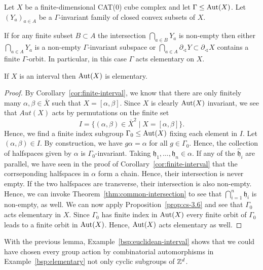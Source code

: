\begin{prop}
  \label{prop:cs-3.6}
  Let \(X\) be a finite-dimensional CAT(0) cube complex and let \(\Gamma \leq \operatorname{Aut}(X)\). Let \((Y_a)_{a \in A}\) be a \(\Gamma\)-invariant family of closed convex subsets of \(X\).

  If for any finite subset \(B \subset A\) the intersection \(\bigcap_{a \in B}Y_a\)  is non-empty then either \(\bigcap_{a \in A} Y_a\) is a non-empty \(\Gamma\)-invariant subspace or \(\bigcap_{a \in A} \partial_{\sphericalangle} Y \subset \partial_{\sphericalangle}X\) contains a finite \(\Gamma\)-orbit. In particular, in this case \(\Gamma\) acts elementary on \(X\).
\end{prop}

\begin{lemma}
  \label{lem:f-3.19}
  If \(X\) is an interval then \(\operatorname{Aut}(X)\) is elementary.
\end{lemma}

\begin{proof}
  By Corollary~\ref{cor:finite-interval}, we know that there are only finitely many \(\alpha, \beta \in \bar X\) such that \(X = [\alpha, \beta]\). Since \(X\) is clearly \(\operatorname{Aut}(X)\) invariant, we see that \(Aut(X)\) acts by permutations on the finite set
  \[
    I = \{(\alpha, \beta) \in \bar X^2 \mid X = [\alpha, \beta]\}.
  \]
  Hence, we find a finite index subgroup \(\Gamma_0 \leq \operatorname{Aut}(X)\) fixing each element in \(I\). Let \((\alpha, \beta) \in I\). By construction, we have \(g\alpha = \alpha\) for all \(g \in \Gamma_0\). Hence, the collection of halfspaces given by \(\alpha\) is \(\Gamma_0\)-invariant. Taking \(\mathfrak{h}_1, \dots, \mathfrak{h}_n \in \alpha\). If any of the \(\mathfrak{\hat h}_i\) are parallel, we have seen in the proof of Corollary~\ref{cor:finite-interval} that the corrseponding halfspaces in \(\alpha\) form a chain. Hence, their intersection is never empty. If the two halfspaces are transverse, their intersection is also non-empty. Hence, we can invoke Theorem~\ref{thm:common-intersection} to see that \(\bigcap_{i=1}^n \mathfrak{h}_i\) is non-empty, as well. We can now apply Proposition~\ref{prop:cs-3.6} and see that \(\Gamma_0\) acts elementary in \(X\). Since \(\Gamma_0\) has finite index in \(\operatorname{Aut}(X)\) every finite orbit of \(\Gamma_0\) leads to a finite orbit in \(\operatorname{Aut}(X)\). Hence, \(\operatorname{Aut}(X)\) acts elementary as well.
\end{proof}

\begin{rem}
  With the previous lemma, Example~\ref{bsp:euclidean-interval} shows that we could have chosen every group action by combinatorial automorphisms in Example~\ref{bsp:elementary} not only cyclic subgroups of \(\mathbb{Z}^d\).
\end{rem}

